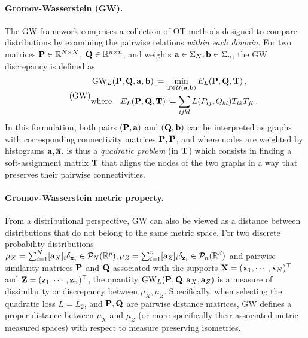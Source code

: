\paragraph{Gromov-Wasserstein (GW).} The GW framework \citep{memoli2011gromov,sturm2012space} comprises a collection of OT methods designed to compare distributions by examining the pairwise relations \emph{within each domain}. For two matrices ${\mathbf{P}} \in \mathbb{R}^{N \times N}$, ${\mathbf{Q}} \in \mathbb{R}^{n \times n}$, and weights ${\mathbf{a}} \in \Sigma_N, {\mathbf{b}} \in \Sigma_n$, the GW discrepancy is defined as
\begin{equation}
\label{eq:gw_pb} 
\tag{GW}
\begin{split}
	&\operatorname{GW}_L ({\mathbf{P}}, {\mathbf{Q}}, {\mathbf{a}}, {\mathbf{b}}) \coloneqq \min_{{\mathbf{T}} \in {\mathcal{U}}({\mathbf{a}}, {\mathbf{b}})} E_L({\mathbf{P}}, {\mathbf{Q}}, {\mathbf{T}})\,, \\
	&\text{where} \quad E_L({\mathbf{P}}, {\mathbf{Q}}, {\mathbf{T}}) \coloneqq \sum_{ijkl}  L(P_{ij}, Q_{kl}) T_{ik} T_{jl} \:.
\end{split}
\end{equation}
In this formulation, both pairs $({\mathbf{P}}, {\mathbf{a}})$ and $({\mathbf{Q}}, {\mathbf{b}})$ can be interpreted as graphs with corresponding connectivity matrices ${\mathbf{P}}, \overline {{\mathbf{P}}}$, and where nodes are weighted by histograms ${\mathbf{a}}, \overline {{\mathbf{a}}}$.  is thus a \emph{quadratic problem} (in ${\mathbf{T}}$) which consists in finding a soft-assignment matrix ${\mathbf{T}}$ that aligns the nodes of the two graphs in a way that preserves their pairwise connectivities. 

\paragraph{Gromov-Wasserstein metric property.}
From a distributional perspective, GW can also be viewed as a distance between distributions that do not belong to the same metric space. For two discrete probability distributions $\mu_X = \sum_{i=1}^N [{\mathbf{a}}_X]_i \delta_{{\mathbf{x}}_i} \in {\mathcal{P}}_N(\mathbb{R}^{p}), \mu_Z =\sum_{i=1}^n [{\mathbf{a}}_Z]_i \delta_{{\mathbf{z}}_i} \in {\mathcal{P}}_n(\mathbb{R}^d)$ and pairwise similarity matrices ${\mathbf{P}}$ and ${\mathbf{Q}}$ associated with the supports ${\mathbf{X}} = ({\mathbf{x}}_1, \cdots, {\mathbf{x}}_N)^\top$ and ${\mathbf{Z}} = ({\mathbf{z}}_1, \cdots, {\mathbf{z}}_n)^\top$, the quantity $\operatorname{GW}_L ({\mathbf{P}}, {\mathbf{Q}}, {\mathbf{a}}_X, {\mathbf{a}}_Z)$ is a measure of dissimilarity or discrepancy between $\mu_X, \mu_Z$. Specifically, when selecting the quadratic loss $L=L_2$, and ${\mathbf{P}}, {\mathbf{Q}}$ are pairwise distance matrices, GW defines a proper distance between $\mu_X$ and $\mu_Z$ (or more specifically their associated metric measured spaces) with respect to measure preserving isometries.

